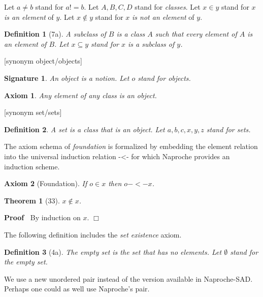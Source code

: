 \documentclass{article}
\newenvironment{forthel}{\begin{leftbar}}{\end{leftbar}}
\newenvironment{proofn}{\noindent\textbf{Proof\ }}{\hspace*{\fill}$\Box$\medskip}
\newtheorem{axiom}{Axiom}
\newtheorem{theorem}{Theorem}
\newtheorem{definition}{Definition}
\newtheorem{signature}{Signature}
\begin{document}
\begin{forthel}
Let $a \neq b$ stand for $a != b$.
Let $A, B, C, D$ stand for \emph{classes}.
Let $x \in y$ stand for $x$ \emph{is an element} of $y$. 
Let $x \notin y$ stand for $x$ \emph{is not an element} of $y$. 

\begin{definition}[7a] A \emph{subclass} of $B$ is a class $A$ such that every element of $A$ is an element of $B$. Let $x \subseteq y$ stand for $x$ is a subclass of $y$.
\end{definition}
[synonym object/objects]
\begin{signature} An \emph{object} is a notion. Let $o$ stand for objects.
\end{signature}

\begin{axiom} Any element of any class is an object.
\end{axiom}

[synonym set/sets]
\begin{definition} A \emph{set} is a class that is an object. Let $a,b,c,x,y,z$ stand for sets.
\end{definition}
\end{forthel}
The axiom schema of \emph{foundation} is formalized by embedding the element relation into the universal induction relation -<- for which Naproche provides an induction scheme.
\begin{forthel}
\begin{axiom}[Foundation] If $o \in x$ then $o -<- x$.
\end{axiom}

\begin{theorem}[33] $x \notin x$.
\end{theorem}
\begin{proofn} By induction on $x$.
\end{proofn}
\end{forthel}
The following definition includes the \emph{set existence} axiom.
\begin{forthel}
\begin{definition}[4a] The \emph{empty set} is the set 
that has no elements. Let $\emptyset$ stand for the empty set.
\end{definition}
\end{forthel}
We use a new unordered pair instead of the version available in Naproche-SAD. Perhaps one could as well use Naproche's pair.
\end{document}
